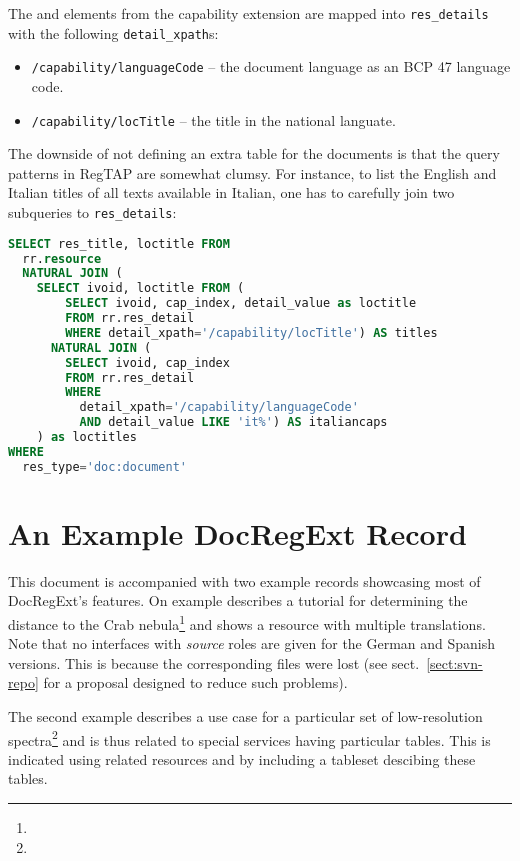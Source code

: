 \documentclass{ivoa}
\begin{document}
The  and  elements from the
 capability extension are mapped into
\verb|res_details| with the following \verb|detail_xpath|s:

\begin{itemize}

\item \texttt{/capability/languageCode} -- the document language as an
BCP 47 \citep{std:BCP47} language code.
\item \texttt{/capability/locTitle} -- the title in the national
languate.
\end{itemize}

The downside of not defining an extra table for the documents is that
the query patterns in RegTAP are somewhat clumsy.  For instance, to list
the English and Italian titles of all texts available in Italian, one
has to carefully join two subqueries to \verb|res_details|:

\begin{lstlisting}[language=SQL]
SELECT res_title, loctitle FROM
  rr.resource
  NATURAL JOIN (
    SELECT ivoid, loctitle FROM (
        SELECT ivoid, cap_index, detail_value as loctitle
        FROM rr.res_detail
        WHERE detail_xpath='/capability/locTitle') AS titles
      NATURAL JOIN (
        SELECT ivoid, cap_index
        FROM rr.res_detail
        WHERE
          detail_xpath='/capability/languageCode'
          AND detail_value LIKE 'it%') AS italiancaps
    ) as loctitles
WHERE
  res_type='doc:document'
\end{lstlisting}


\appendix

\section{An Example DocRegExt Record}

This document is accompanied with two example records showcasing most of
DocRegExt's features.  On example describes a tutorial for determining
the distance to the Crab
nebula\footnote{} and shows
a resource with multiple translations.
Note that no interfaces with \textit{source} roles
are given for the German and Spanish versions.  This is because the
corresponding files were lost (see sect.~\ref{sect:svn-repo} for a
proposal designed to reduce such problems).

The second example describes a use case for a particular set of
low-resolution spectra\footnote{} and is
thus related to special services having particular tables.  This is
indicated using related resources and by including a tableset descibing
these tables.
\end{document}
